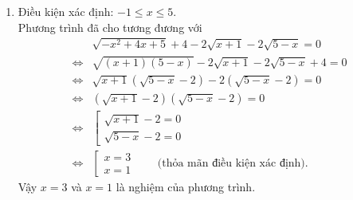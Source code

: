 \begin{bt}
{\begin{enumerate}
\begin{align*}
\Leftrightarrow   &\left[\begin{array}{l} x=\pm 2\\ x=18 \end{array}\right.
\end{align*}
Nghiệm $x=-2$ không thỏa mãn điều kiện xác định. Vậy $x=2$ và $x=18$ là nghiệm của phương trình.
\item Điều kiện xác định: $-1 \le x \le 5$.\\
Phương trình đã cho tương đương với
\begin{align*}
&\sqrt{-x^2+4x+5}+4-2\sqrt{x+1}-2\sqrt{5-x}=0\\
\Leftrightarrow &\sqrt{(x+1)(5-x)}-2\sqrt{x+1}-2\sqrt{5-x}+4=0\\
\Leftrightarrow
 &\sqrt{x+1}\left(\sqrt{5-x}-2 \right)-2\left( \sqrt{5-x}-2\right)=0\\
\Leftrightarrow &\left(\sqrt{x+1}-2 \right) \left(\sqrt{5-x}-2 \right)=0\\
\Leftrightarrow &\left[\begin{array}{l} \sqrt{x+1}-2=0\\ \sqrt{5-x}-2=0\end{array}\right.\\
\Leftrightarrow &\left[\begin{array}{l} x=3\\ x=1\end{array}\right. \qquad \text{(thỏa mãn điều kiện xác định).}
\end{align*}
Vậy $x=3$ và $x=1$ là nghiệm của phương trình.
\end{enumerate}
}
\end{bt}

